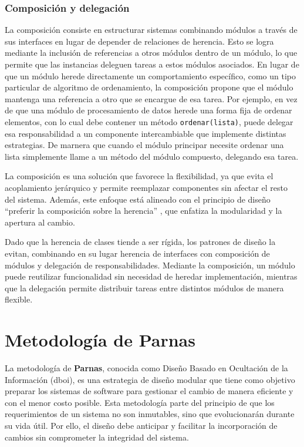 \subsubsection*{Composición y delegación}
La composición consiste en estructurar sistemas combinando módulos a través de sus interfaces en lugar de depender de relaciones de herencia. Esto se logra mediante la inclusión de referencias a otros módulos dentro de un módulo, lo que permite que las instancias deleguen tareas a estos módulos asociados. En lugar de que un módulo herede directamente un comportamiento específico, como un tipo particular de algoritmo de ordenamiento, la composición propone que el módulo mantenga una referencia a otro que se encargue de esa tarea. Por ejemplo, en vez de que una módulo de procesamiento de datos herede una forma fija de ordenar elementos, con lo cual debe contener un método \verb|ordenar(lista)|, puede delegar esa responsabilidad a un componente intercambiable que implemente distintas estrategias. De marnera que cuando el módulo principar necesite ordenar una lista simplemente llame a un método del módulo compuesto, delegando esa tarea.

 La composición es una solución que favorece la flexibilidad, ya que evita el acoplamiento jerárquico y permite reemplazar componentes sin afectar el resto del sistema. Además, este enfoque está alineado con el principio de diseño ``preferir la composición sobre la herencia'' \cite{Gamma:1995:DPE:186897}, que enfatiza la modularidad y la apertura al cambio.

Dado que la herencia de clases tiende a ser rígida, los patrones de diseño la evitan, combinando en su lugar herencia de interfaces con composición de módulos y delegación de responsabilidades. Mediante la composición, un módulo puede reutilizar funcionalidad sin necesidad de heredar implementación, mientras que la delegación permite distribuir tareas entre distintos módulos de manera flexible.


\section{Metodología de Parnas}
\label{metoParnas}

La metodología de \textbf{Parnas}\cite{Parnas1972}, conocida como Diseño Basado en Ocultación de la Información (\gls{dboi}), es una estrategia de diseño modular que tiene como objetivo preparar los sistemas de software para gestionar el cambio de manera eficiente y con el menor costo posible. Esta metodología parte del principio de que los requerimientos de un sistema no son inmutables, sino que evolucionarán durante su vida útil. Por ello, el diseño debe anticipar y facilitar la incorporación de cambios sin comprometer la integridad del sistema.

